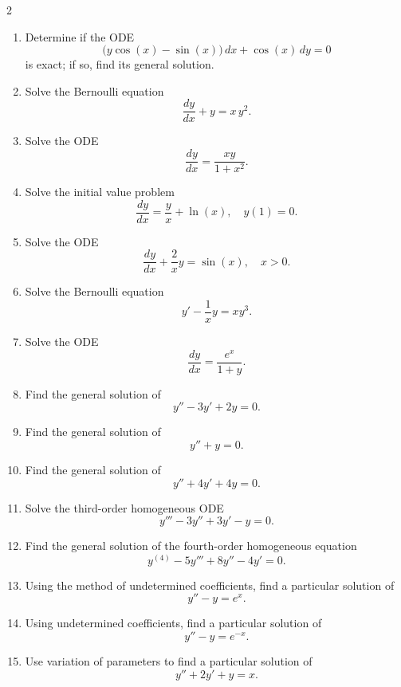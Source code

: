 \begin{multicols}{2}
\begin{enumerate}
    \item Determine if the ODE
    \[
    \bigl(y\cos(x)-\sin(x)\bigr)\,dx + \cos(x)\,dy = 0
    \]
    is exact; if so, find its general solution.

    \item Solve the Bernoulli equation
    \[
    \frac{dy}{dx} + y = x\,y^2.
    \]

    \item Solve the ODE
    \[
    \frac{dy}{dx} = \frac{xy}{1+x^2}.
    \]

    \item Solve the initial value problem
    \[
    \frac{dy}{dx} = \frac{y}{x} + \ln(x), \quad y(1)=0.
    \]

    \item Solve the ODE
    \[
    \frac{dy}{dx} + \frac{2}{x}y = \sin(x), \quad x>0.
    \]

    \item Solve the Bernoulli equation
    \[
    y' - \frac{1}{x}y = xy^3.
    \]

    \item Solve the ODE
    \[
    \frac{dy}{dx} = \frac{e^x}{1+y}.
    \]

  \item Find the general solution of
    \[
    y'' - 3y' + 2y = 0.
    \]
    
  \item Find the general solution of
    \[
    y'' + y = 0.
    \]
    
  \item Find the general solution of
    \[
    y'' + 4y' + 4y = 0.
    \]
    
  \item Solve the third-order homogeneous ODE
    \[
    y''' - 3y'' + 3y' - y = 0.
    \]
    
  \item Find the general solution of the fourth-order homogeneous equation
    \[
    y^{(4)} - 5y''' + 8y'' - 4y' = 0.
    \]
    
  \item Using the method of undetermined coefficients, find a particular solution of
    \[
    y'' - y = e^x.
    \]
    
  \item Using undetermined coefficients, find a particular solution of
    \[
    y'' - y = e^{-x}.
    \]
    
  \item Use variation of parameters to find a particular solution of
    \[
    y'' + 2y' + y = x.
    \]
    

\end{enumerate}
\end{multicols}
